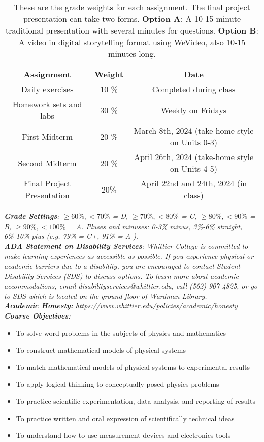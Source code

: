 \documentclass[10pt]{article}
\begin{document}
\begin{table}
\centering
\begin{tabular}{| c | c | c |}
\hline
\textbf{Assignment} & \textbf{Weight} & \textbf{Date} \\ \hline
Daily exercises & 10 \% & Completed during class\\ \hline
Homework sets and labs & 30 \% & Weekly on Fridays \\ \hline
First Midterm & 20 \% & March 8th, 2024 (take-home style on Units 0-3)\\ \hline
Second Midterm & 20 \% & April 26th, 2024 (take-home style on Units 4-5) \\ \hline
Final Project Presentation & 20\% & April 22nd and 24th, 2024 (in class) \\ \hline
\end{tabular}
\caption{\label{tab:grades} These are the grade weights for each assignment. The final project presentation can take two forms.  \textbf{Option A}: A 10-15 minute traditional presentation with several minutes for questions.  \textbf{Option B}: A video in digital storytelling format using WeVideo, also 10-15 minutes long.}
\end{table}
\noindent
\textit{\textbf{Grade Settings}: $\geq 60\%, <70\%$ = D, $\geq 70\%, <80\%$ = C, $\geq 80\%, <90\%$ = B, $\geq 90\%, <100\%$ = A. Pluses and minuses: 0-3\% minus, 3\%-6\% straight, 6\%-10\% plus (e.g. 79\% = C+, 91\% = A-).} \\
\textit{\textbf{ADA Statement on Disability Services}: Whittier College is committed to make learning experiences as accessible as possible. If you experience physical or academic barriers due to a disability, you are encouraged to contact Student Disability Services (SDS) to discuss options. To learn more about academic accommodations, email disabilityservices@whittier.edu, call (562) 907-4825, or go to SDS which is located on the ground floor of Wardman Library.} \\
\textit{\textbf{Academic Honesty:} \url{https://www.whittier.edu/policies/academic/honesty}} \\
\noindent
\textit{\textbf{Course Objectives}:}
\begin{itemize}
\item To solve word problems in the subjects of physics and mathematics
\item To construct mathematical models of physical systems
\item To match mathematical models of physical systems to experimental results
\item To apply logical thinking to conceptually-posed physics problems
\item To practice scientific experimentation, data analysis, and reporting of results
\item To practice written and oral expression of scientifically technical ideas
\item To understand how to use measurement devices and electronics tools
\end{itemize}
\end{document}
